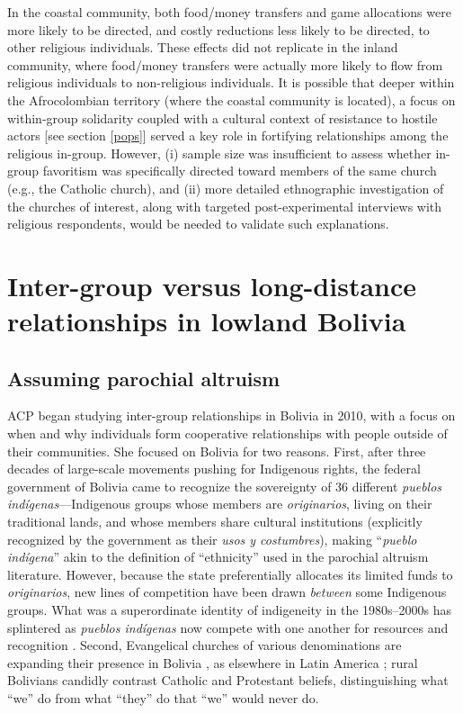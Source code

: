 \documentclass[bibauthoryear]{aa}
\begin{document}
In the coastal community, both food/money transfers and game allocations were more likely to be directed, and costly reductions less likely to be directed, to other religious individuals. These effects did not replicate in the inland community, where food/money transfers were actually more likely to flow from religious individuals to non-religious individuals. It is possible that deeper within the Afrocolombian territory (where the coastal community is located), a focus on within-group solidarity coupled with a cultural context of resistance to hostile actors [see section \ref{pops}] \citep{oyola2017local} served a key role in fortifying relationships among the religious in-group. However, (i) sample size was insufficient to assess whether in-group favoritism was specifically directed toward members of the same church (e.g., the Catholic church), and (ii) more detailed ethnographic investigation of the churches of interest, along with targeted post-experimental interviews with religious respondents, would be needed to validate such explanations.


\section{Inter-group versus long-distance relationships in lowland Bolivia}
\subsection{Assuming parochial altruism}
ACP began studying inter-group relationships in Bolivia in 2010, with a focus on when and why   individuals form cooperative relationships with people outside of their communities.   She focused on Bolivia for two reasons. First, after three decades of large-scale movements pushing for Indigenous rights, the federal government of Bolivia came to recognize the sovereignty of 36 different  \textit{pueblos ind\'igenas}---Indigenous groups whose members are \textit{originarios}, living on their traditional lands, and whose members share cultural institutions (explicitly recognized by the government as their  \textit{usos y costumbres}), making ``\textit{pueblo ind\'igena}'' akin to the definition of ``ethnicity'' used in the parochial altruism literature. However, because the state preferentially allocates its limited funds to \textit{originarios}, new lines of competition have been drawn \textit{between} some Indigenous groups. What was a superordinate identity of indigeneity in the 1980s--2000s has splintered as \textit{pueblos ind\'igenas} now compete with one another for resources and recognition \citep{fontana2014indigenous}.
Second, Evangelical churches of various denominations are expanding their presence in Bolivia \citep{lesley1993religious}, as elsewhere in Latin America \citep{stoll1990latin}; rural Bolivians candidly contrast Catholic and Protestant beliefs, distinguishing what ``we'' do from what ``they'' do that ``we'' would never do. 
\end{document}
